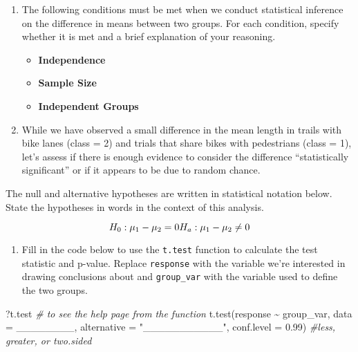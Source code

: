 \documentclass[
]{article}
\newenvironment{Shaded}{\begin{snugshade}}{\end{snugshade}}
\newcommand{\AttributeTok}[1]{\textcolor[rgb]{0.77,0.63,0.00}{#1}}
\newcommand{\CommentTok}[1]{\textcolor[rgb]{0.56,0.35,0.01}{\textit{#1}}}
\newcommand{\FloatTok}[1]{\textcolor[rgb]{0.00,0.00,0.81}{#1}}
\newcommand{\FunctionTok}[1]{\textcolor[rgb]{0.00,0.00,0.00}{#1}}
\newcommand{\NormalTok}[1]{#1}
\newcommand{\SpecialCharTok}[1]{\textcolor[rgb]{0.00,0.00,0.00}{#1}}
\newcommand{\StringTok}[1]{\textcolor[rgb]{0.31,0.60,0.02}{#1}}
\providecommand{\tightlist}{%
  \setlength{\itemsep}{0pt}\setlength{\parskip}{0pt}}
\begin{document}
\begin{enumerate}
\def\labelenumi{\arabic{enumi}.}
\setcounter{enumi}{11}
\tightlist
\item
  The following conditions must be met when we conduct statistical
  inference on the difference in means between two groups. For each
  condition, specify whether it is met and a brief explanation of your
  reasoning.

  \begin{itemize}
  \tightlist
  \item
    \textbf{Independence}
  \item
    \textbf{Sample Size}
  \item
    \textbf{Independent Groups}
  \end{itemize}
\item
  While we have observed a small difference in the mean length in trails
  with bike lanes (class = 2) and trials that share bikes with
  pedestrians (class = 1), let's assess if there is enough evidence to
  consider the difference ``statistically significant'' or if it appears
  to be due to random chance.
\end{enumerate}

The null and alternative hypotheses are written in statistical notation
below. State the hypotheses in words in the context of this analysis.

\[H_0: \mu_1 - \mu_2 = 0 \\
H_a: \mu_1 - \mu_2 \neq 0\]

\begin{enumerate}
\def\labelenumi{\arabic{enumi}.}
\setcounter{enumi}{13}
\tightlist
\item
  Fill in the code below to use the \texttt{t.test} function to
  calculate the test statistic and p-value. Replace \texttt{response}
  with the variable we're interested in drawing conclusions about and
  \texttt{group\_var} with the variable used to define the two groups.
\end{enumerate}

\begin{Shaded}
\begin{Highlighting}[]
\NormalTok{?t.test }\CommentTok{\# to see the help page from the function}
\FunctionTok{t.test}\NormalTok{(response }\SpecialCharTok{\textasciitilde{}}\NormalTok{ group\_var, }\AttributeTok{data =}\NormalTok{ \_\_\_\_\_\_\_\_, }
       \AttributeTok{alternative =} \StringTok{"\_\_\_\_\_\_\_\_\_\_\_"}\NormalTok{, }
       \AttributeTok{conf.level =} \FloatTok{0.99}\NormalTok{) }\CommentTok{\#less, greater, or two.sided}
\end{Highlighting}
\end{Shaded}
\end{document}
